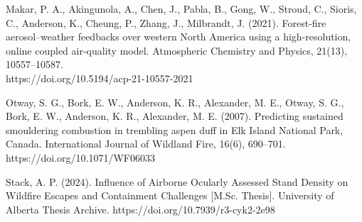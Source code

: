 \begin{mybibliography}
Makar, P. A., Akingunola, A., Chen, J., Pabla, B., Gong, W., Stroud, C., Sioris, C., Anderson, K., Cheung, P., Zhang, J., Milbrandt, J. (2021). Forest-fire aerosol–weather feedbacks over western North America using a high-resolution, online coupled air-quality model. Atmospheric Chemistry and Physics, 21(13), 10557–10587. \\ https://doi.org/10.5194/acp-21-10557-2021

Otway, S. G., Bork, E. W., Anderson, K. R., Alexander, M. E., Otway, S. G., Bork, E. W., Anderson, K. R., Alexander, M. E. (2007). Predicting sustained smouldering combustion in trembling aspen duff in Elk Island National Park, Canada. International Journal of Wildland Fire, 16(6), 690–701. https://doi.org/10.1071/WF06033

Stack, A. P. (2024). Influence of Airborne Ocularly Assessed Stand Density on Wildfire Escapes and Containment Challenges [M.Sc. Thesis]. University of Alberta Thesis Archive. https://doi.org/10.7939/r3-cyk2-2e98

\end{mybibliography}

\clearpage

%


